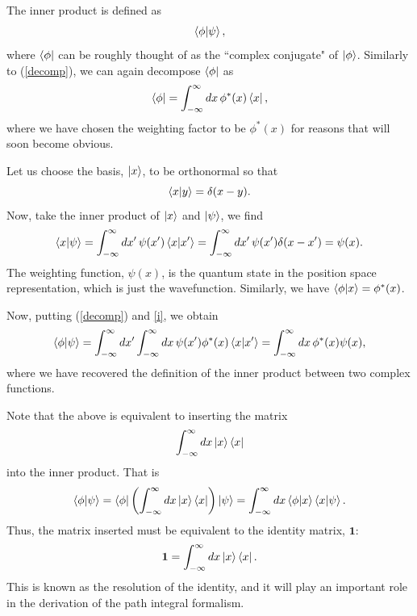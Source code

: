\documentclass[12pt,a4paper]{article}
\begin{document}
The inner product is defined as
\begin{equation}
    \braket{\phi}{\psi},
    \label{i}
\end{equation}
where $\bra{\phi}$ can be roughly thought of as the ``complex conjugate" of $\ket{\phi}$. Similarly to (\ref{decomp}), we can again decompose $\bra{\phi}$ as
\begin{equation}
    \bra{\phi} = \int^\infty_{-\infty}dx\,\phi^*(x)\bra{x},
\end{equation}
where we have chosen the weighting factor to be $\phi^*(x)$ for reasons that will soon become obvious.

Let us choose the basis, $\ket{x}$, to be orthonormal so that
\begin{equation}
    \braket{x}{y} = \delta(x-y).
\end{equation}
Now, take the inner product of $\ket{x}$ and $\ket{\psi}$, we find
\begin{equation}
    \braket{x}{\psi} = \int^\infty_{-\infty}dx'\,\psi(x')\braket{x}{x'} = \int^\infty_{-\infty}dx'\,\psi(x')\delta(x-x') = \psi(x).
\end{equation}
The weighting function, $\psi(x)$, is the quantum state in the position space representation, which is just the wavefunction. Similarly, we have $\braket{\phi}{x} = \phi^*(x)$.

Now, putting (\ref{decomp}) and \ref{i}, we obtain
\begin{equation}
    \braket{\phi}{\psi} = \int^\infty_{-\infty}dx'\int^\infty_{-\infty}dx\,\psi(x')\phi^*(x)\braket{x}{x'}  = \int^\infty_{-\infty}dx\,\phi^*(x)\psi(x),
\end{equation}
where we have recovered the definition of the inner product between two complex functions.

Note that the above is equivalent to inserting the matrix
\begin{equation}
    \int^\infty_{-\infty}dx\ket{x}\bra{x}
\end{equation}
into the inner product. That is
\begin{equation}
    \braket{\phi}{\psi} = \bra{\phi}\left(\int^\infty_{-\infty}dx\ket{x}\bra{x}\right)\ket{\psi} = \int^\infty_{-\infty}dx\braket{\phi}{x}\braket{x}{\psi}.
\end{equation}
Thus, the matrix inserted must be equivalent to the identity matrix, $\mathbf{1}$:
\begin{equation}
    \mathbf{1} = \int^\infty_{-\infty}dx\ket{x}\bra{x}.
    \label{identity}
\end{equation}
This is known as the resolution of the identity, and it will play an important role in the derivation of the path integral formalism.
\end{document}
